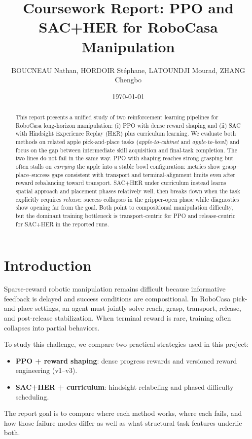 \documentclass[11pt,a4paper]{article}
\title{Coursework Report: PPO and SAC+HER for RoboCasa Manipulation}
\author{\small BOUCNEAU Nathan, HORDOIR Stéphane, LATOUNDJI Mourad, ZHANG Chengbo}
\date{\today}
\begin{document}
\maketitle

\begin{abstract}
This report presents a unified study of two reinforcement learning pipelines for RoboCasa long-horizon manipulation: (i) PPO with dense reward shaping and (ii) SAC with Hindsight Experience Replay (HER) plus curriculum learning. We evaluate both methods on related apple pick-and-place tasks (\textit{apple-to-cabinet} and \textit{apple-to-bowl}) and focus on the gap between intermediate skill acquisition and final-task completion. The two lines do not fail in the same way. PPO with shaping reaches strong grasping but often stalls on \emph{carrying} the apple into a stable bowl configuration: metrics show grasp--place--success gaps consistent with transport and terminal-alignment limits even after reward rebalancing toward transport. SAC+HER under curriculum instead learns spatial approach and placement phases relatively well, then breaks down when the task explicitly requires \emph{release}: success collapses in the gripper-open phase while diagnostics show opening far from the goal. Both point to compositional manipulation difficulty, but the dominant training bottleneck is transport-centric for PPO and release-centric for SAC+HER in the reported runs.
\end{abstract}

\tableofcontents
\clearpage

\section{Introduction}
Sparse-reward robotic manipulation remains difficult because informative feedback is delayed and success conditions are compositional. In RoboCasa pick-and-place settings, an agent must jointly solve reach, grasp, transport, release, and post-release stabilization. When terminal reward is rare, training often collapses into partial behaviors.

To study this challenge, we compare two practical strategies used in this project:
\begin{itemize}
    \item \textbf{PPO + reward shaping}: dense progress rewards and versioned reward engineering (v1--v3).
    \item \textbf{SAC+HER + curriculum}: hindsight relabeling and phased difficulty scheduling.
\end{itemize}
\noindent The report goal is to compare where each method works, where each fails, and how those failure modes differ as well as what structural task features underlie both.
\end{document}
